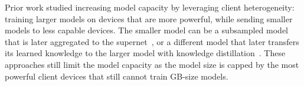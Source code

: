 \documentclass{article}
\begin{document}
Prior work studied increasing model capacity by leveraging client heterogeneity: training larger models on devices that are more powerful, while sending smaller models to less capable devices. The smaller model can be a subsampled model that is later aggregated to the supernet~\cite{Mani-expanding_reach,Mani-fjord, Mani-heterofl}, or a different model that later transfers its learned knowledge to the larger model with knowledge distillation~\cite{Mani-lin2020ensemble, Mani-fedmd}.
%
These approaches still limit the model capacity as the model size is capped by the most powerful client devices that still cannot train GB-size models.

%
%


\end{document}
